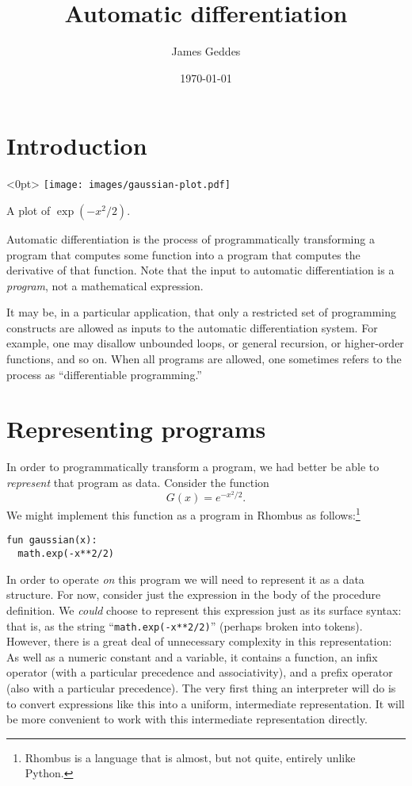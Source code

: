 \documentclass[11pt, a4paper]{article}
\title{Automatic differentiation}
\author{James Geddes}
\date{\today}
\newcommand{\cd}[1]{\texttt{#1}}
\begin{document}
\maketitle

\section{Introduction}


\begin{marginfigure}<0pt>
  \centering
  \texttt{[image: images/gaussian-plot.pdf]}
  \caption{A plot of $\exp(-x^2/2)$.\label{fig:gaussian-plot}}
\end{marginfigure}
Automatic differentiation is the process of programmatically
transforming a program that computes some function into a program that
computes the derivative of that function. Note that the input to
automatic differentiation is a \emph{program}, not a mathematical
expression.

It may be, in a particular application, that only a restricted set of
programming constructs are allowed as inputs to the automatic
differentiation system. For example, one may disallow unbounded loops,
or general recursion, or higher-order functions, and so on. When all
programs are allowed, one sometimes refers to the process as
``differentiable programming.''

\section{Representing programs}

In order to programmatically transform a program, we had better be
able to \emph{represent} that program as data. Consider the function
\begin{equation}
  \label{eq:gaussian-example}
  G(x) = e^{-x^2/2}.
\end{equation}
We might implement this function as a program in Rhombus
as follows:\footnote{Rhombus is a language that is almost, but not quite,
  entirely unlike Python.}
\begin{verbatim}
fun gaussian(x):
  math.exp(-x**2/2)
\end{verbatim}
In order to operate \emph{on} this program we will need to represent
it as a data structure. For now, consider just the expression in the
body of the procedure definition. We \emph{could} choose to represent
this expression just as its surface syntax: that is, as the string
``\cd{math.exp(-x**2/2)}'' (perhaps broken into tokens). However,
there is a great deal of unnecessary complexity in this
representation: As well as a numeric constant and a variable, it
contains a function, an infix operator (with a particular precedence
and associativity), and a prefix operator (also with a particular
precedence). The very first thing an interpreter will do is to convert
expressions like this into a uniform, intermediate representation. It
will be more convenient to work with this intermediate representation
directly.
\end{document}
